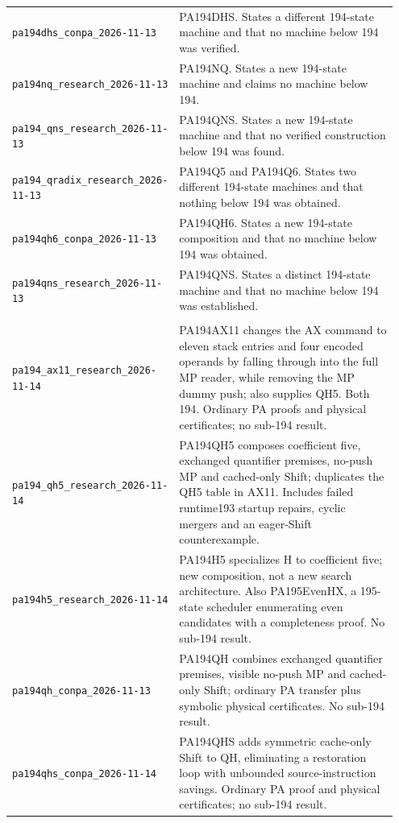 \begin{longtable}{@{}>{\raggedright\arraybackslash}p{0.36\linewidth}>{\raggedright\arraybackslash}p{0.59\linewidth}@{}}
\nolinkurl{pa194dhs_conpa_2026-11-13} & PA194DHS. States a different 194-state machine and that no machine below 194 was verified.\\[4pt]
\nolinkurl{pa194nq_research_2026-11-13} & PA194NQ. States a new 194-state machine and claims no machine below 194.\\[4pt]
\nolinkurl{pa194_qns_research_2026-11-13} & PA194QNS. States a new 194-state machine and that no verified construction below 194 was found.\\[4pt]
\nolinkurl{pa194_qradix_research_2026-11-13} & PA194Q5 and PA194Q6. States two different 194-state machines and that nothing below 194 was obtained.\\[4pt]
\nolinkurl{pa194qh6_conpa_2026-11-13} & PA194QH6. States a new 194-state composition and that no machine below 194 was obtained.\\[4pt]
\nolinkurl{pa194qns_research_2026-11-13} & PA194QNS. States a distinct 194-state machine and that no machine below 194 was established.\\[4pt]
\midrule\multicolumn{2}{@{}l}{\textbf{Current incoming archives (11)}}\\\midrule
\nolinkurl{pa194_ax11_research_2026-11-14} & PA194AX11 changes the AX command to eleven stack entries and four encoded operands by falling through into the full MP reader, while removing the MP dummy push; also supplies QH5. Both 194. Ordinary PA proofs and physical certificates; no sub-194 result.\\[4pt]
\nolinkurl{pa194_qh5_research_2026-11-14} & PA194QH5 composes coefficient five, exchanged quantifier premises, no-push MP and cached-only Shift; duplicates the QH5 table in AX11. Includes failed runtime193 startup repairs, cyclic mergers and an eager-Shift counterexample.\\[4pt]
\nolinkurl{pa194h5_research_2026-11-14} & PA194H5 specializes H to coefficient five; new composition, not a new search architecture. Also PA195EvenHX, a 195-state scheduler enumerating even candidates with a completeness proof. No sub-194 result.\\[4pt]
\nolinkurl{pa194qh_conpa_2026-11-13} & PA194QH combines exchanged quantifier premises, visible no-push MP and cached-only Shift; ordinary PA transfer plus symbolic physical certificates. No sub-194 result.\\[4pt]
\nolinkurl{pa194qhs_conpa_2026-11-14} & PA194QHS adds symmetric cache-only Shift to QH, eliminating a restoration loop with unbounded source-instruction savings. Ordinary PA proof and physical certificates; no sub-194 result.\\[4pt]

\end{longtable}
